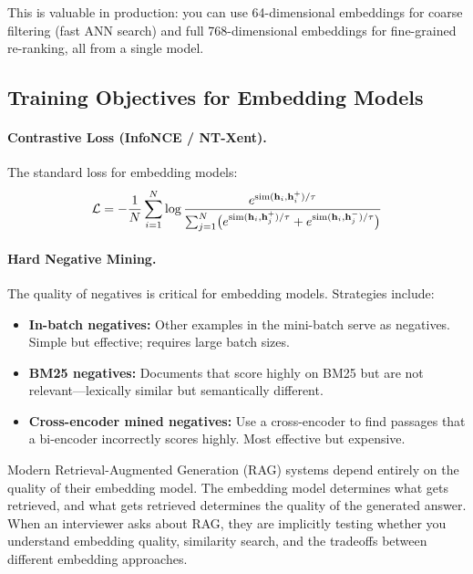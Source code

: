 This is valuable in production: you can use 64-dimensional embeddings for
coarse filtering (fast ANN search) and full 768-dimensional embeddings for
fine-grained re-ranking, all from a single model.

\subsection{Training Objectives for Embedding Models}

\paragraph{Contrastive Loss (InfoNCE / NT-Xent).}
The standard loss for embedding models:
\[
    \mathcal{L} = -\frac{1}{N} \sum_{i=1}^{N} \log
    \frac{e^{\text{sim}(\mathbf{h}_i, \mathbf{h}_i^+)/\tau}}
         {\sum_{j=1}^{N}\bigl(
           e^{\text{sim}(\mathbf{h}_i, \mathbf{h}_j^+)/\tau}
           + e^{\text{sim}(\mathbf{h}_i, \mathbf{h}_j^-)/\tau}\bigr)}
\]

\paragraph{Hard Negative Mining.}
The quality of negatives is critical for embedding models.  Strategies include:
\begin{itemize}
    \item \textbf{In-batch negatives:} Other examples in the mini-batch serve
    as negatives.  Simple but effective; requires large batch sizes.
    \item \textbf{BM25 negatives:} Documents that score highly on BM25 but
    are not relevant---lexically similar but semantically different.
    \item \textbf{Cross-encoder mined negatives:} Use a cross-encoder to find
    passages that a bi-encoder incorrectly scores highly.  Most effective but
    expensive.
\end{itemize}

\begin{keyinsight}
Modern Retrieval-Augmented Generation (RAG) systems depend entirely on the
quality of their embedding model.  The embedding model determines what gets
retrieved, and what gets retrieved determines the quality of the generated
answer.  When an interviewer asks about RAG, they are implicitly testing
whether you understand embedding quality, similarity search, and the
tradeoffs between different embedding approaches.
\end{keyinsight}



